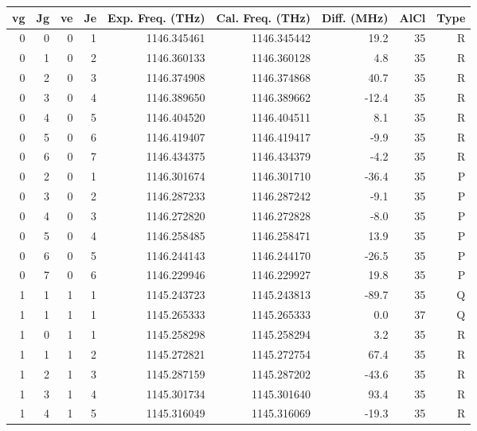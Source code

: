 \begin{table}
\begin{tabu}{rrrrrrrrr}
\toprule
vg & Jg & ve & Je & Exp. Freq. (THz) & Cal. Freq. (THz) & Diff. (MHz) & AlCl & Type\\ \midrule 
\rowfont{\color{red}}0 & 0 & 0 & 1 & 1146.345461 & 1146.345442 & 19.2 & 35 & R\\
\rowfont{\color{red}}0 & 1 & 0 & 2 & 1146.360133 & 1146.360128 & 4.8 & 35 & R\\
\rowfont{\color{red}}0 & 2 & 0 & 3 & 1146.374908 & 1146.374868 & 40.7 & 35 & R\\
\rowfont{\color{red}}0 & 3 & 0 & 4 & 1146.389650 & 1146.389662 & -12.4 & 35 & R\\
\rowfont{\color{red}}0 & 4 & 0 & 5 & 1146.404520 & 1146.404511 & 8.1 & 35 & R\\
\rowfont{\color{red}}0 & 5 & 0 & 6 & 1146.419407 & 1146.419417 & -9.9 & 35 & R\\
\rowfont{\color{red}}0 & 6 & 0 & 7 & 1146.434375 & 1146.434379 & -4.2 & 35 & R\\
\rowfont{\color{blue}}0 & 2 & 0 & 1 & 1146.301674 & 1146.301710 & -36.4 & 35 & P\\
\rowfont{\color{blue}}0 & 3 & 0 & 2 & 1146.287233 & 1146.287242 & -9.1 & 35 & P\\
\rowfont{\color{blue}}0 & 4 & 0 & 3 & 1146.272820 & 1146.272828 & -8.0 & 35 & P\\
\rowfont{\color{blue}}0 & 5 & 0 & 4 & 1146.258485 & 1146.258471 & 13.9 & 35 & P\\
\rowfont{\color{blue}}0 & 6 & 0 & 5 & 1146.244143 & 1146.244170 & -26.5 & 35 & P\\
\rowfont{\color{blue}}0 & 7 & 0 & 6 & 1146.229946 & 1146.229927 & 19.8 & 35 & P\\
1 & 1 & 1 & 1 & 1145.243723 & 1145.243813 & -89.7 & 35 & Q\\
1 & 1 & 1 & 1 & 1145.265333 & 1145.265333 & 0.0 & 37 & Q\\
\rowfont{\color{red}}1 & 0 & 1 & 1 & 1145.258298 & 1145.258294 & 3.2 & 35 & R\\
\rowfont{\color{red}}1 & 1 & 1 & 2 & 1145.272821 & 1145.272754 & 67.4 & 35 & R\\
\rowfont{\color{red}}1 & 2 & 1 & 3 & 1145.287159 & 1145.287202 & -43.6 & 35 & R\\
\rowfont{\color{red}}1 & 3 & 1 & 4 & 1145.301734 & 1145.301640 & 93.4 & 35 & R\\
\rowfont{\color{red}}1 & 4 & 1 & 5 & 1145.316049 & 1145.316069 & -19.3 & 35 & R\\

\end{tabu}
\end{table}
